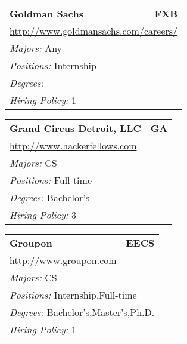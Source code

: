 \documentclass[twoside]{article}
\begin{document}
\begin{center}
\begin{multicols}{3}
\begin{FlushLeft}
\begin{minipage}{\columnwidth}
\end{minipage}
 
\begin{minipage}{\columnwidth}\begin{tabularx}{.95\columnwidth}{Xr}
                 {\Large\bf Goldman Sachs} & {\Large\bf FXB}\\
    \multicolumn{2}{p{.95\columnwidth}}{\url{http://www.goldmansachs.com/careers/}}\\
    \multicolumn{2}{p{.95\columnwidth}}{\emph{Majors:} Any}\\
    \multicolumn{2}{p{.95\columnwidth}}{\emph{Positions:} Internship}\\
    \multicolumn{2}{p{.95\columnwidth}}{\emph{Degrees:} }\\
    \multicolumn{2}{p{.95\columnwidth}}{\emph{Hiring Policy:} 1}\\
    \end{tabularx}
    
\end{minipage}
 
\begin{minipage}{\columnwidth}\begin{tabularx}{.95\columnwidth}{Xr}
                 {\Large\bf Grand Circus Detroit, LLC} & {\Large\bf GA}\\
    \multicolumn{2}{p{.95\columnwidth}}{\url{http://www.hackerfellows.com}}\\
    \multicolumn{2}{p{.95\columnwidth}}{\emph{Majors:} CS}\\
    \multicolumn{2}{p{.95\columnwidth}}{\emph{Positions:} Full-time}\\
    \multicolumn{2}{p{.95\columnwidth}}{\emph{Degrees:} Bachelor's}\\
    \multicolumn{2}{p{.95\columnwidth}}{\emph{Hiring Policy:} 3}\\
    \end{tabularx}
    
\end{minipage}
 
\begin{minipage}{\columnwidth}\begin{tabularx}{.95\columnwidth}{Xr}
                 {\Large\bf Groupon} & {\Large\bf EECS}\\
    \multicolumn{2}{p{.95\columnwidth}}{\url{http://www.groupon.com}}\\
    \multicolumn{2}{p{.95\columnwidth}}{\emph{Majors:} CS}\\
    \multicolumn{2}{p{.95\columnwidth}}{\emph{Positions:} Internship,Full-time}\\
    \multicolumn{2}{p{.95\columnwidth}}{\emph{Degrees:} Bachelor's,Master's,Ph.D.}\\
    \multicolumn{2}{p{.95\columnwidth}}{\emph{Hiring Policy:} 1}\\
    \end{tabularx}
    

\end{minipage}
\end{FlushLeft}
\end{multicols}
\end{center}
\end{document}

